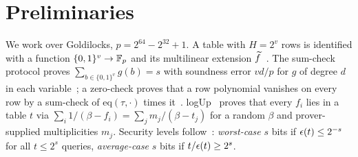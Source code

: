 \section{Preliminaries}\label{sec:prelim}

We work over Goldilocks, $p = 2^{64} - 2^{32} + 1$. %
A table with $H = 2^v$ rows is identified with a function $\{0,1\}^v \to \mathbb{F}_p$ and its multilinear extension
$\widetilde{f}$~\cite[§3.5]{Thaler}. The sum-check protocol proves $\sum_{b \in \{0,1\}^v} g(b) = s$ with soundness
error $v d/p$ for $g$ of degree $d$ in each variable~\cite[§4.1]{Thaler}; a zero-check proves that a row
polynomial vanishes on every row by a sum-check of $\mathrm{eq}(\tau, \cdot)$ times it~\cite{CBBZ23}.
logUp~\cite{Hab22} proves that every $f_i$ lies in a table $t$ via
$\sum_i 1/(\beta - f_i) = \sum_j m_j/(\beta - t_j)$ for a random $\beta$ and prover-supplied multiplicities $m_j$.
Security levels follow~\cite{CY24}: \emph{worst-case} $s$ bits if $\epsilon(t) \le 2^{-s}$ for all $t \le 2^s$ queries,
\emph{average-case} $s$ bits if $t/\epsilon(t) \ge 2^s$.
